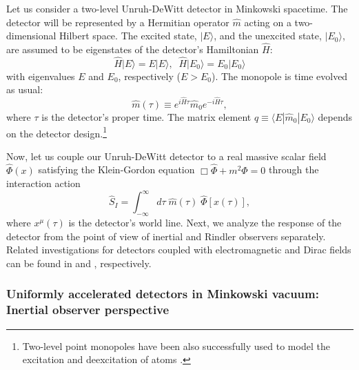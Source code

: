 \documentclass[12pt,nofootinbib,floatfix,aps,prd,showpacs,amsmath,amssymb,eqsecnum]{revtex4-2}
\begin{document}
Let us consider a two-level Unruh-DeWitt detector in 
Minkowski spacetime.
The detector will be represented by a Hermitian operator $\hat m$ acting
on a 
two-dimensional Hilbert space.  The excited state, $|E \rangle$, and the
unexcited state, $|E_0 \rangle$, are assumed to be eigenstates of 
the detector's Hamiltonian $\hat H$:
\begin{equation}
\hat H | E   \rangle = E   | E    \rangle,\;\;
\hat H | E_0 \rangle = E_0 | E_0  \rangle
\end{equation}
with eigenvalues $E$ and $E_0$, respectively ($E>E_0$). The
monopole is time evolved as usual:
\begin{equation}
\hat m(\tau )\equiv e^{i\hat H \tau} \hat m_0 e^{-i\hat H \tau}, 
\label{m}
\end{equation}
where $\tau$ is the detector's proper time. The matrix element
$q \equiv \langle E | \hat m_0 | E_0 \rangle $
depends on the detector 
design.\footnote{Two-level point monopoles have been also 
successfully used to model the excitation and deexcitation of 
atoms  \cite{Audretschetal94, Zhuetal07}.}

Now, let us couple our Unruh-DeWitt detector to a real massive 
scalar field $\hat{\Phi}(x)$
satisfying the Klein-Gordon equation 
$\Box \hat{\Phi} +m^2 \hat{\Phi} = 0$ through the interaction action
\begin{equation}
     \hat S_I =
       \int_{-\infty}^{\infty}
       d\tau \; \hat m (\tau )\; 
\hat{\Phi}[x(\tau)],
  \label{SI1}
\end{equation}
where $x^\mu (\tau)$ is the detector's world line. 
Next, we analyze the response of the detector from the point of view 
of inertial and Rindler observers separately. Related investigations 
for detectors coupled with electromagnetic and Dirac fields can 
be found in \textcite{Boyer80,Boyer84} and \textcite{Iyeretal80}, 
respectively. 


\subsubsection{Uniformly accelerated detectors in Minkowski vacuum:
               Inertial observer perspective}
\label{subsubsection:uadinertial}
\end{document}
